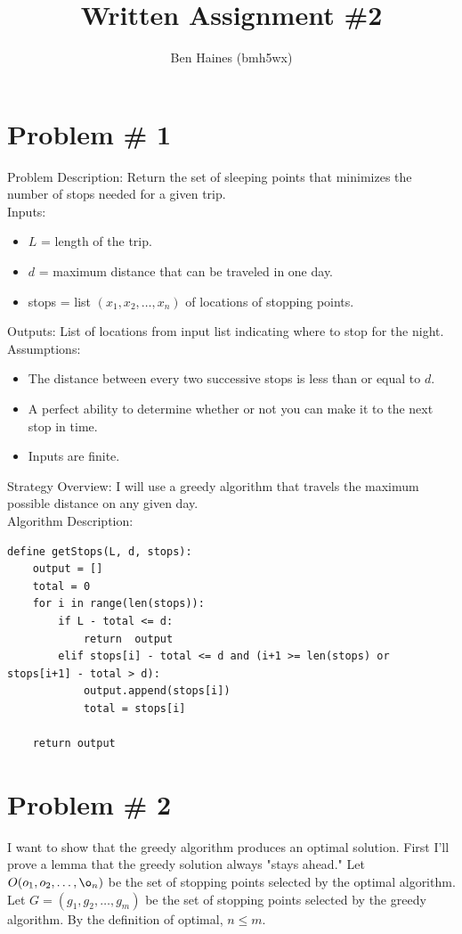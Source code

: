 \documentclass{article}
\begin{document}
\title{Written Assignment \#2}
\author{Ben Haines (bmh5wx)}

\section*{Problem \# 1}
Problem Description: Return the set of sleeping points that minimizes the number of stops needed for a given trip.\\

Inputs:
\begin{itemize}
    \item $L$ = length of the trip.
    \item $d$ = maximum distance that can be traveled in one day.
    \item stops = list $(x_1, x_2, \ldots, x_n)$ of locations of stopping points.
\end{itemize}

Outputs: List of locations from input list indicating where to stop for the night.\\

Assumptions:
\begin{itemize}
    \item The distance between every two successive stops is less than or equal to $d$.
    \item A perfect ability to determine whether or not you can make it to the next stop in time.
    \item Inputs are finite.
\end{itemize}

Strategy Overview:
I will use a greedy algorithm that travels the maximum possible distance on any given day.\\

Algorithm Description:
\begin{lstlisting}
define getStops(L, d, stops):
    output = []
    total = 0
    for i in range(len(stops)):
        if L - total <= d:
            return  output
        elif stops[i] - total <= d and (i+1 >= len(stops) or stops[i+1] - total > d):
            output.append(stops[i])
            total = stops[i]

    return output
\end{lstlisting}

\section*{Problem \# 2}
I want to show that the greedy algorithm produces an optimal solution. First I'll prove a lemma that the greedy solution always "stays ahead." Let $O(o_1, o_2, \ldots, \o_n)$ be the set of stopping points selected by the optimal algorithm. Let $G = (g_1, g_2, \ldots, g_m)$ be the set of stopping points selected by the greedy algorithm. By the definition of optimal, $n \le m$. \\
\end{document}
